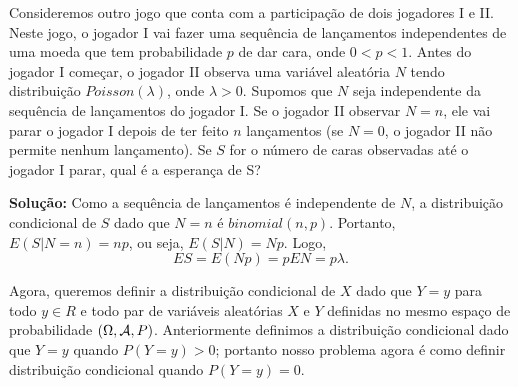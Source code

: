 \begin{frame}
\begin{exem}
Consideremos outro jogo que conta com a participação de dois jogadores I e II. Neste jogo, o jogador I vai fazer uma sequência de lançamentos independentes de uma moeda que tem probabilidade $p$ de dar cara, onde $0<p<1$. Antes do jogador I começar, o jogador II observa uma variável aleatória $N$ tendo distribuição $Poisson(\lambda)$, onde $\lambda>0$. Supomos que $N$ seja independente da sequência de lançamentos do jogador I. Se o jogador II observar $N=n$, ele vai parar o jogador I depois de ter feito $n$ lançamentos (se $N=0$, o jogador II não permite nenhum lançamento). Se $S$ for o número de caras observadas até o jogador I parar, qual é a esperança de S?

\bigskip
{\bf Solução:} Como a sequência de lançamentos é independente de $N$, a distribuição condicional de $S$ dado que $N=n$ é $binomial(n,p)$. Portanto, $E(S|N=n)=np$, ou seja, $E(S|N)=Np$. Logo,
$$ES=E(Np)=pEN=p\lambda.$$
\end{exem}

\bigskip
Agora, queremos definir a distribuição condicional de
$X$ dado que $Y=y$ para todo $y\in R$ e todo par de variáveis
aleatórias $X$ e $Y$ definidas no mesmo espaço de probabilidade
$(\Omega,{\cal A},P)$.  Anteriormente definimos a distribuição
condicional dado que $Y=y$ quando $P(Y=y)>0$; portanto nosso
problema agora é como definir distribuição condicional quando
$P(Y=y)=0$. 

\end{frame}

